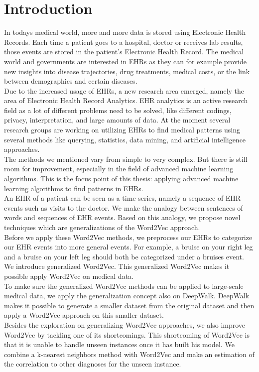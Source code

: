 \chapter{Introduction}
\label{cha:introduction}

In todays medical world, more and more data is stored using Electronic Health Records. Each time a patient goes to a hospital, doctor or receives lab results, those events are stored in the patient's Electronic Health Record. The medical world and governments are interested in EHRs as they can for example provide new insights into disease trajectories, drug treatments, medical costs, or the link between demographics and certain diseases. \\

Due to the increased usage of EHRs, a new research area emerged, namely the area of Electronic Health Record Analytics. EHR analytics is an active research field as a lot of different problems need to be solved, like different codings, privacy, interpretation, and large amounts of data. At the moment several research groups are working on utilizing EHRs to find medical patterns using several methods like querying, statistics, data mining, and artificial intelligence approaches. \\
The methods we mentioned vary from simple to very complex. But there is still room for improvement, especially in the field of advanced machine learning algorithms. This is the focus point of this thesis: applying advanced machine learning algorithms to find patterns in EHRs. \\

An EHR of a patient can be seen as a time series, namely a sequence of EHR events such as visits to the doctor. We make the analogy between sentences of words and sequences of EHR events. Based on this analogy, we propose novel techniques which are generalizations of the Word2Vec approach. \\
Before we apply these Word2Vec methods, we preprocess our EHRs to categorize our EHR events into more general events. For example, a bruise on your right leg and a bruise on your left leg should both be categorized under a bruises event. \\

We introduce generalized Word2Vec. This generalized Word2Vec makes it possible apply Word2Vec on medical data. \\
To make sure the generalized Word2Vec methods can be applied to large-scale medical data, we apply the generalization concept also on DeepWalk. DeepWalk makes it possible to generate a smaller dataset from the original dataset and then apply a Word2Vec approach on this smaller dataset. \\
Besides the exploration on generalizing Word2Vec approaches, we also improve Word2Vec by tackling one of its shortcomings. This shortcoming of Word2Vec is that it is unable to handle unseen instances once it has built his model. We combine a k-nearest neighbors method with Word2Vec and make an estimation of the correlation to other diagnoses for the unseen instance. \\

